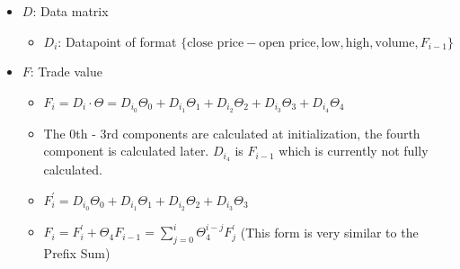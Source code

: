 \documentclass[11pt]{exam}
\theoremstyle{quest}
\begin{document}
\begin{itemize}
    \item $D$: Data matrix \\
    \begin{itemize}
        \item $D_i$: Datapoint of format $\{\text{close price} - \text{open price}, \text{low}, \text{high}, \text{volume},F_{i-1}\}$
    \end{itemize}
    \item $F$: Trade value%
    \begin{itemize}
        \item $F_i = D_i \cdot \Theta = D_{i_0}\Theta_0 + D_{i_1}\Theta_1 +D_{i_2}\Theta_2 +D_{i_3}\Theta_3 +D_{i_4}\Theta_4$
        \item The 0th - 3rd components are calculated at initialization, the fourth component is calculated later. $D_{i_4}$ is $F_{i-1}$ which is currently not fully calculated.
        \item $F_i^\prime =  D_{i_0}\Theta_0 + D_{i_1}\Theta_1 +D_{i_2}\Theta_2 +D_{i_3}\Theta_3$
        \item $F_i = F_i^\prime + \Theta_4 F_{i-1} = \sum_{j=0}^i \Theta_4^{i-j} F_j^\prime$ (This form is very similar to the Prefix Sum)


\end{itemize}
\end{itemize}
\end{document}
